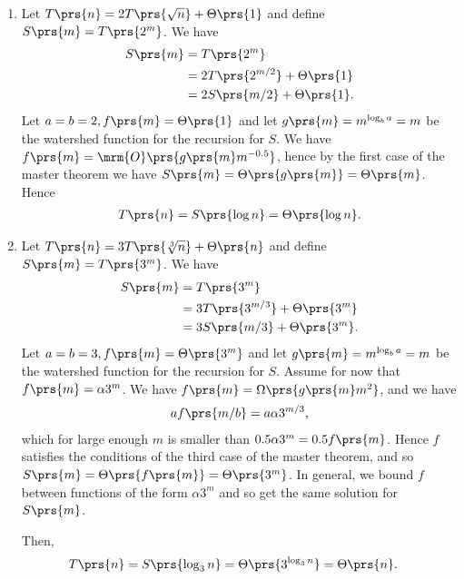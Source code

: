 \documentclass[oneside]{scrbook}
\theoremstyle{definition}
\begin{document}
\begin{problem}
\begin{enumerate}[label=\alph*.]
\item %
Let $T\prs{n} = 2 T\prs{\sqrt{n}} + \Theta\prs{1}$ and define $S\prs{m} = T\prs{2^m}$. We have
\begin{align*}
S\prs{m} &= T\prs{2^m}
\\&= 2 T\prs{2^{m/2}} + \Theta\prs{1}
\\&= 2 S\prs{m/2} + \Theta\prs{1} \text{.}
\end{align*}
Let $a = b = 2, f\prs{m} = \Theta\prs{1}$ and let $g\prs{m} = m^{\log_b a} = m$ be the watershed function for the recursion for $S$. We have $f\prs{m} = \mrm{O}\prs{g\prs{m} m^{-0.5}}$, hence by the first case of the master theorem we have $S\prs{m} = \Theta\prs{g\prs{m}} = \Theta\prs{m}$. Hence
\begin{align*}
T\prs{n} = S\prs{\log n} = \Theta\prs{\log n} \text{.}
\end{align*}
\item %
Let $T\prs{n} = 3 T\prs{\sqrt[3]{n}} + \Theta\prs{n}$ and define $S\prs{m} = T\prs{3^m}$. We have
\begin{align*}
S\prs{m} &= T\prs{3^m}
\\&= 3 T\prs{3^{m/3}} + \Theta\prs{3^m}
\\&= 3 S\prs{m/3} + \Theta\prs{3^m} \text{.}
\end{align*}
Let $a = b = 3, f\prs{m} = \Theta\prs{3^m}$ and let $g\prs{m} = m^{\log_b a} = m$ be the watershed function for the recursion for $S$. Assume for now that $f\prs{m} = \alpha 3^m$. We have $f\prs{m} = \Omega\prs{g\prs{m} m^2}$, and we have
\begin{align*}
a f\prs{m/b} = a \alpha 3^{m/3} \text{,}
\end{align*}
which for large enough $m$ is smaller than $0.5 \alpha 3^m = 0.5 f\prs{m}$. Hence $f$ satisfies the conditions of the third case of the master theorem, and so $S\prs{m} = \Theta\prs{f\prs{m}} = \Theta\prs{3^m}$. In general, we bound $f$ between functions of the form $\alpha 3^m$ and so get the same solution for $S\prs{m}$.

Then,
\begin{align*}
T\prs{n} &= S\prs{\log_3 n} = \Theta\prs{3^{\log_3 n}} = \Theta\prs{n} \text{.}
\end{align*}
\end{enumerate}
\end{problem}
\end{document}
